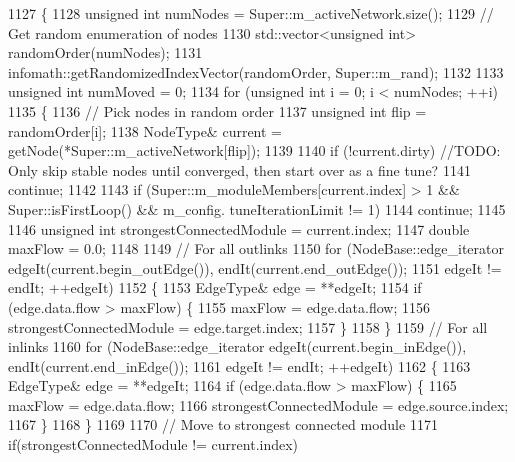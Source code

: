 \begin{DoxyCode}
1127 \{
1128     \textcolor{keywordtype}{unsigned} \textcolor{keywordtype}{int} numNodes = Super::m\_activeNetwork.size();
1129     \textcolor{comment}{// Get random enumeration of nodes}
1130     std::vector<unsigned int> randomOrder(numNodes);
1131     infomath::getRandomizedIndexVector(randomOrder, Super::m\_rand);
1132 
1133     \textcolor{keywordtype}{unsigned} \textcolor{keywordtype}{int} numMoved = 0;
1134     \textcolor{keywordflow}{for} (\textcolor{keywordtype}{unsigned} \textcolor{keywordtype}{int} i = 0; i < numNodes; ++i)
1135     \{
1136         \textcolor{comment}{// Pick nodes in random order}
1137         \textcolor{keywordtype}{unsigned} \textcolor{keywordtype}{int} flip = randomOrder[i];
1138         NodeType& current = getNode(*Super::m\_activeNetwork[flip]);
1139 
1140         \textcolor{keywordflow}{if} (!current.dirty) \textcolor{comment}{//TODO: Only skip stable nodes until converged, then start over as a fine tune?}
1141             \textcolor{keywordflow}{continue};
1142 
1143         \textcolor{keywordflow}{if} (Super::m\_moduleMembers[current.index] > 1 && Super::isFirstLoop() && m\_config.
      tuneIterationLimit != 1)
1144             \textcolor{keywordflow}{continue};
1145 
1146         \textcolor{keywordtype}{unsigned} \textcolor{keywordtype}{int} strongestConnectedModule = current.index;
1147         \textcolor{keywordtype}{double} maxFlow = 0.0;
1148 
1149         \textcolor{comment}{// For all outlinks}
1150         \textcolor{keywordflow}{for} (NodeBase::edge\_iterator edgeIt(current.begin\_outEdge()), endIt(current.end\_outEdge());
1151                 edgeIt != endIt; ++edgeIt)
1152         \{
1153             EdgeType& edge = **edgeIt;
1154             \textcolor{keywordflow}{if} (edge.data.flow > maxFlow) \{
1155                 maxFlow = edge.data.flow;
1156                 strongestConnectedModule = edge.target.index;
1157             \}
1158         \}
1159         \textcolor{comment}{// For all inlinks}
1160         \textcolor{keywordflow}{for} (NodeBase::edge\_iterator edgeIt(current.begin\_inEdge()), endIt(current.end\_inEdge());
1161                 edgeIt != endIt; ++edgeIt)
1162         \{
1163             EdgeType& edge = **edgeIt;
1164             \textcolor{keywordflow}{if} (edge.data.flow > maxFlow) \{
1165                 maxFlow = edge.data.flow;
1166                 strongestConnectedModule = edge.source.index;
1167             \}
1168         \}
1169 
1170         \textcolor{comment}{// Move to strongest connected module}
1171         \textcolor{keywordflow}{if}(strongestConnectedModule != current.index)

\end{DoxyCode}
